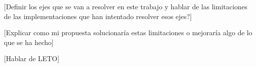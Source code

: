[Definir los ejes que se van a resolver en este trabajo y hablar de las limitaciones de las implementaciones que han intentado resolver esos ejes?]

[Explicar como mi propuesta solucionar\'ia estas limitaciones o mejorar\'ia algo de lo que se ha hecho]

[Hablar de LETO]

